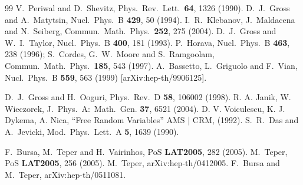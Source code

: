 \begin{thebibliography}{99}
V.~Periwal and D.~Shevitz,
  Phys.\ Rev.\ Lett.\  {\bf 64}, 1326 (1990).
  D.~J.~Gross and A.~Matytsin,
  Nucl.\ Phys.\ B {\bf 429}, 50 (1994).
I.~R.~Klebanov, J.~Maldacena and N.~Seiberg,
  Commun.\ Math.\ Phys.\  {\bf 252}, 275 (2004).
D.~J.~Gross and W.~I.~Taylor,
  Nucl.\ Phys.\ B {\bf 400}, 181 (1993).
P.~Horava,
  Nucl.\ Phys.\ B {\bf 463}, 238 (1996);
S.~Cordes, G.~W.~Moore and S.~Ramgoolam,
  Commun.\ Math.\ Phys.\  {\bf 185}, 543 (1997).
  A.~Bassetto, L.~Griguolo and F.~Vian,
  Nucl.\ Phys.\ B {\bf 559}, 563 (1999)
  [arXiv:hep-th/9906125].

D.~J.~Gross and H.~Ooguri,
  Phys.\ Rev.\ D {\bf 58}, 106002 (1998).
 R. A. Janik, W. Wieczorek, J.\ Phys.\ A:\ Math.\ Gen.
{\bf 37}, 6521 (2004).
D. V. Voiculescu, K. J. Dykema, A. Nica, ``Free Random Variables'' AMS | CRM,
(1992).
S.~R.~Das and A.~Jevicki,
  Mod.\ Phys.\ Lett.\ A {\bf 5}, 1639 (1990).

F.~Bursa, M.~Teper and H.~Vairinhos,
  PoS {\bf LAT2005}, 282 (2005).
 M.~Teper,
  PoS {\bf LAT2005}, 256 (2005).
  M.~Teper,
  arXiv:hep-th/0412005.
F.~Bursa and M.~Teper,
  arXiv:hep-th/0511081.


\end{thebibliography}
